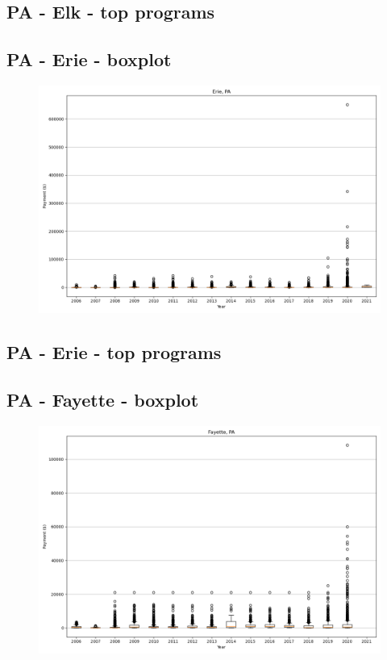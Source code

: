 \subsection*{PA - Elk - top programs}

\newpage
\subsection*{PA - Erie - boxplot}
\begin{figure}[h]
\centering
\includegraphics[width=7in]{../output/boxplots/counties/Erie-PA_boxplot.png}
\end{figure}


\subsection*{PA - Erie - top programs}

\newpage
\subsection*{PA - Fayette - boxplot}
\begin{figure}[h]
\centering
\includegraphics[width=7in]{../output/boxplots/counties/Fayette-PA_boxplot.png}
\end{figure}



